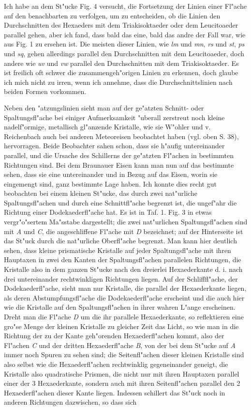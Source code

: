 \documentclass[a4paper, 11pt, oneside, german]{article}
\begin{document}
Ich habe an dem St"ucke Fig. 4 versucht, die Fortsetzung der Linien einer Fl"ache auf den benachbarten zu verfolgen, um zu entscheiden, ob die Linien den Durchschnitten des Hexaeders mit dem Triakisoktaeder oder dem Leucitoaeder parallel gehen, aber ich fand, dass bald das eine, bald das andre der Fall war, wie aus Fig. 1 zu ersehen ist. Die meisten dieser Linien, wie \emph{lm} und \emph{mn}, \emph{rs} und \emph{st}, \emph{ps} und \emph{sq}, gehen allerdings parallel den Durchschnitten mit dem Leucitoaeder, doch andere wie \emph{uv} und \emph{vw} parallel den Durchschnitten mit dem Triakisoktaeder. Es ist freilich oft schwer die zusammengeh"origen Linien zu erkennen, doch glaube ich mich nicht zu irren, wenn ich annehme, dass die Durchschnittslinien nach beiden Formen vorkommen.

Neben den "atzungslinien sieht man auf der ge"atzten Schnitt- oder Spaltungsfl"ache bei einiger Aufmerksamkeit "uberall zerstreut noch kleine nadelf"ormige, metallisch gl"anzende Kristalle, wie sie W"ohler und v. Reichenbach auch bei anderen Meteoreisen beobachtet haben (vgl. oben S. 38), hervorragen. Beide Beobachter sahen schon, dass sie h"aufig untereinander parallel, und die Ursache des Schillerns der ge"atzten Fl"achen in bestimmten Richtungen sind. Bei dem Braunauer Eisen kann man nun auf das bestimmte sehen, dass sie eine untereinander und in Bezug auf das Eisen, worin sie eingemengt sind, ganz bestimmte Lage haben. Ich konnte dies recht gut beobachten bei einem kleinen St"ucke, das durch zwei nat"urliche Spaltungsfl"achen und durch eine Schnittfl"ache begrenzt ist, die ungef"ahr die Richtung einer Dodekaederfl"ache hat. Es ist in Taf. 1. Fig. 3 in etwas vergr"o"sertem Ma"sstabe dargestellt; die zwei nat"urlichen Spaltungsfl"achen sind mit \emph{A} und \emph{C}, die angeschliffene Fl"ache mit \emph{D} bezeichnet; auf der Hinterseite ist das St"uck durch die nat"urliche Oberfl"ache begrenzt. Man kann hier deutlich sehen, dass kleine prismatische Kristalle auf jeder Spaltungsfl"ache mit ihren Hauptaxen in zwei den Kanten der Spaltungsfl"achen parallelen Richtungen, die Kristalle also in dem ganzen St"ucke nach den dreierlei Hexaederkante d. i. nach drei untereinander rechtwinkligen Richtungen liegen. Auf der Schlifffl"ache, der Dodekaederfl"ache, sieht man nur Kristalle, die parallel der Hexaederkante liegen, als deren Abstumpfungsfl"ache die Dodekaederfl"ache erscheint und die auch hier wie die Kristalle auf den Spaltungsfl"achen in ihrer wahren L"ange erscheinen. Dreht man die Fl"ache \emph{D} um die ihr parallele Hexaederkante, so reflektieren eine gro"se Menge der kleinen Kristalle zu gleicher Zeit das Licht, so wie man in die Richtung der zu der Kante geh"orenden Hexaederfl"achen kommt, also der Fl"achen \emph{C} und der dritten Hexaederfl"ache \emph{B}, von der bei dem St"ucke auf \emph{A} immer noch Spuren zu sehen sind; die Seitenfl"achen dieser kleinen Kristalle sind also selbst wie die Hexaederfl"achen rechtwinklig gegeneinander geneigt, die Kristalle also quadratische Prismen, die nicht nur mit ihren Hauptaxen parallel einer der 3 Hexaederkante, sondern auch mit ihren Seitenfl"achen parallel den 2 Hexaederfl"achen dieser Kante liegen. Indessen schillert das St"uck noch in anderen Richtungen dazwischen, so dass sich 
\end{document}
